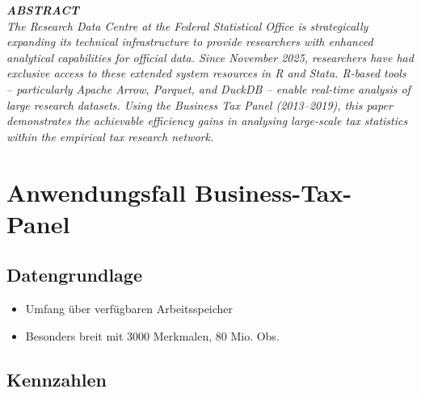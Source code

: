 \documentclass[
  german,
  10pt,
  twoside]{article}
\providecommand{\tightlist}{%
  \setlength{\itemsep}{0pt}\setlength{\parskip}{0pt}}
\renewcommand*\contentsname{Inhaltsverzeichnis}
\newcommand\contentsname{Inhaltsverzeichnis}
\begin{document}
\begin{titlepage}
\begin{minipage}[t]{11.8cm}
\vspace{0.3cm}

{\itshape\color{wistaDarkGray}\bfseries\MakeUppercase{Abstract}}\\[0.15cm]
\small\itshape
The Research Data Centre at the Federal Statistical Office is strategically expanding its technical infrastructure to provide researchers with enhanced analytical capabilities for official data. Since November 2025, researchers have had exclusive access to these extended system resources in R and Stata. R-based tools -- particularly Apache Arrow, Parquet, and DuckDB -- enable real-time analysis of large research datasets. Using the Business Tax Panel (2013--2019), this paper demonstrates the achievable efficiency gains in analysing large-scale tax statistics within the empirical tax research network.

\end{minipage}

\vfill

\vspace{0.5cm}
\noindent{}

\end{titlepage}

\pagestyle{fancy}

\renewcommand*\contentsname{Inhaltsverzeichnis}
{
\hypersetup{linkcolor=}
\setcounter{tocdepth}{3}
\tableofcontents
}

\section{Anwendungsfall Business-Tax-Panel}\label{sec-btp}

\subsection{Datengrundlage}\label{datengrundlage}

\begin{itemize}
\tightlist
\item
  Umfang über verfügbaren Arbeitsspeicher
\item
  Besonders breit mit 3000 Merkmalen, 80 Mio. Obs.
\end{itemize}

\subsection{Kennzahlen}\label{kennzahlen}
\end{document}
